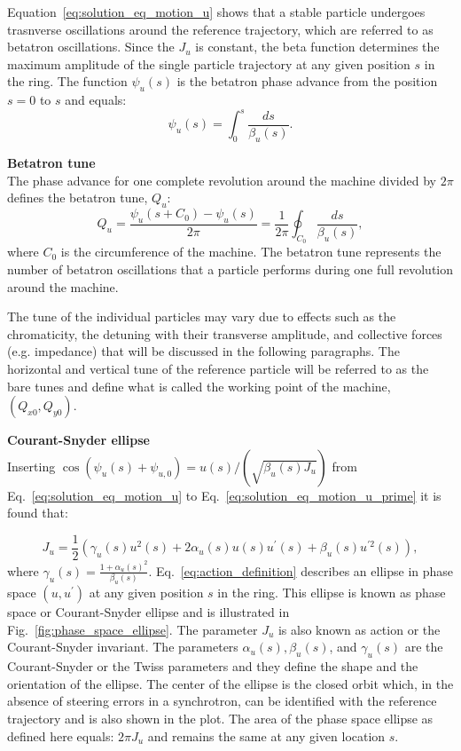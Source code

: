Equation~\eqref{eq:solution_eq_motion_u} shows that a stable particle undergoes trasnverse oscillations around the reference trajectory, which are referred to as betatron oscillations. Since the $J_u$ is constant, the beta function determines the maximum amplitude of the single particle trajectory at any given position $s$ in the ring.
The function $\psi_u(s)$ is the betatron phase advance from the position $s=0$ to $s$ and equals:
\begin{equation}\label{eq:phase_advance_definition_with_twiss}
    \psi_u(s)= \int_{0}^{s} \frac{ds}{\beta_u(s)}.
\end{equation}

\textbf{Betatron tune}\\
The phase advance for one complete revolution around the machine divided by $2\pi$ defines the betatron tune, $Q_u$:
\begin{equation}\label{eq:betatron_tune}
    Q_u = \frac{\psi_u(s+C_0)-\psi_u(s)}{2\pi} = \frac{1}{2\pi} \oint_{C_0} \frac{ds}{\beta_u(s)},
\end{equation}
where $C_0$ is the circumference of the machine. The betatron tune represents the number of betatron oscillations that a particle performs during one full revolution around the machine.

The tune of the individual particles may vary due to effects such as the chromaticity, the detuning with their transverse amplitude, and collective forces (e.g. impedance) that will be discussed in the following paragraphs. The horizontal and vertical tune of the reference particle will be referred to as the bare tunes and define what is called the working point of the machine, $(Q_{x0}, Q_{y0})$. 

\textbf{Courant-Snyder ellipse}\\
Inserting $\cos{(\psi_u(s)+ \psi_{u,0})} = u(s)/(\sqrt{\beta_u(s) J_u})$ from Eq.~\eqref{eq:solution_eq_motion_u} to Eq.~\eqref{eq:solution_eq_motion_u_prime} it is found that:

\begin{equation}\label{eq:action_definition}
    J_u = \frac{1}{2} (\gamma_u(s) u^2(s) + 2 \alpha_u(s) u(s) u^\prime(s) + \beta_u(s) u^{\prime 2}(s)),
\end{equation}
where $\gamma_u(s)=\frac{1+\alpha_u(s)^2}{\beta_u(s)}$. Eq.~\eqref{eq:action_definition} describes an ellipse in phase space $(u, u^\prime)$ at any given position $s$ in the ring. This ellipse is known as phase space or Courant-Snyder ellipse and is illustrated in Fig.~\ref{fig:phase_space_ellipse}. The parameter $J_u$ is also known as action or the Courant-Snyder invariant. The parameters $\alpha_u(s), \beta_u(s)$, and $\gamma_u(s)$ are the Courant-Snyder or the Twiss parameters and they define the shape and the orientation of the ellipse. The center of the ellipse is the closed orbit which, in the absence of steering errors in a synchrotron, can be identified with the reference trajectory and is also shown in the plot. The area of the phase space ellipse as defined here equals: $2\pi J_u$ and remains the same at any given location $s$.

